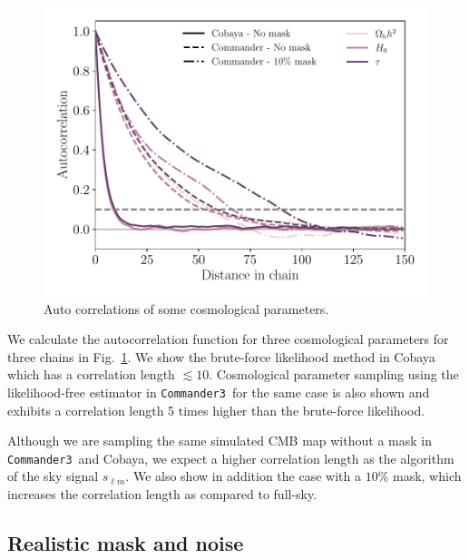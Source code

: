 \documentclass[twocolumn]{../common/aa}
\def\commanderthree{\texttt{Commander3}}
\begin{document}
\begin{figure}
	\centering
	\includegraphics[width=\linewidth]{figures/auto_correlation.pdf}
	\caption{\label{fig:autocorrelation}Auto correlations of some cosmological parameters.}
\end{figure}

We calculate the autocorrelation function for three cosmological parameters for three chains in Fig.~\ref{fig:autocorrelation}. We show the brute-force likelihood method in Cobaya which has a correlation length $\lesssim 10$. Cosmological parameter sampling using the likelihood-free estimator in \commanderthree\ for the same case is also shown and exhibits a correlation length 5 times higher than the brute-force likelihood.

Although we are sampling the same simulated CMB map without a mask in \commanderthree\ and Cobaya, we expect a higher correlation length as the algorithm of \citet{racine:2016}  the sky signal $s_{\ell m}$. We also show in addition the case with a $10\%$ mask, which increases the correlation length as compared to full-sky.

\subsection{Realistic mask and noise}
\end{document}
